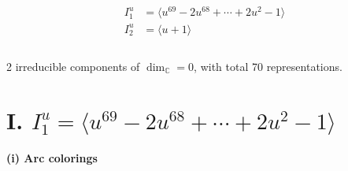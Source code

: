 \documentclass[1p]{elsarticle_modified}
\theoremstyle{definition}
\begin{document}
\begin{align*}
I^u_{1}&=\langle 
u^{69}-2 u^{68}+\cdots+2 u^2-1\rangle \\
I^u_{2}&=\langle 
u+1\rangle \\
\\
\end{align*}
\raggedright * 2 irreducible components of $\dim_{\mathbb{C}}=0$, with total 70 representations.\\
\newpage
\renewcommand{\arraystretch}{1}
\centering \section*{I. $I^u_{1}= \langle u^{69}-2 u^{68}+\cdots+2 u^2-1 \rangle$}
\flushleft \textbf{(i) Arc colorings}\\
\end{document}
